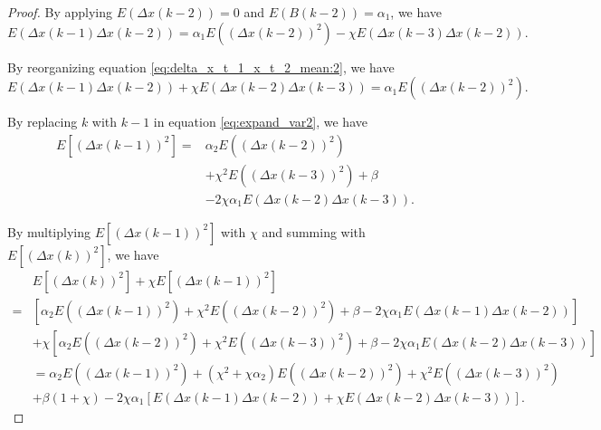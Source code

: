 \begin{proof}
By applying $ E( \Delta x(k-2) ) = 0 $ and $ E( B(k-2) ) = \alpha_{1} $, we have
\begin{equation}
\label{eq:delta_x_t_1_x_t_2_mean:2}
E( \Delta x(k-1) \Delta x(k-2) ) = \alpha_{1} E( ( \Delta x(k-2) )^{2} ) - \chi E( \Delta x(k-3) \Delta x(k-2) ).
\end{equation}

By reorganizing equation \eqref{eq:delta_x_t_1_x_t_2_mean:2}, we have
\begin{equation}
\label{eq:delta_x_t_1_x_t_2_mean:3}
E( \Delta x(k-1) \Delta x(k-2) ) + \chi E( \Delta x(k-2) \Delta x(k-3) ) = \alpha_{1} E( ( \Delta x(k-2) )^{2} ) .
\end{equation}

By replacing $ k $ with $ k - 1 $ in equation \eqref{eq:expand_var2}, we have
\begin{equation}
\label{eq:expand_var3}
\begin{aligned}
E[ (\Delta x(k-1))^{2} ] = & \alpha_{2} E( ( \Delta x(k-2) )^{2} ) \\
& + \chi^{2} E( ( \Delta x(k-3) )^{2} ) + \beta \\
& - 2 \chi \alpha_{1} E( \Delta x(k-2) \Delta x(k-3) ).
\end{aligned}
\end{equation}

By multiplying $ E[ (\Delta x(k-1))^{2} ] $ with $ \chi $ and summing with $ E[ (\Delta x(k))^{2} ] $, we have
\begin{equation}
\label{eq:generate_minus}
\begin{aligned}
& E[ (\Delta x(k))^{2} ] + \chi E[ (\Delta x(k-1))^{2} ] \\
= & [ \alpha_{2} E( ( \Delta x(k-1) )^{2} ) + \chi^{2} E( ( \Delta x(k-2) )^{2} ) + \beta - 2 \chi \alpha_{1} E( \Delta x(k-1) \Delta x(k-2) ) ] \\
& + \chi [  \alpha_{2} E( ( \Delta x(k-2) )^{2} ) + \chi^{2} E( ( \Delta x(k-3) )^{2} ) + \beta - 2 \chi \alpha_{1} E( \Delta x(k-2) \Delta x(k-3) ) ] \\
& = \alpha_{2} E( ( \Delta x(k-1) )^{2} ) + ( \chi^{2} + \chi \alpha_{2} ) E( ( \Delta x(k-2) )^{2} ) + \chi^{2} E( ( \Delta x(k-3) )^{2} ) \\
& + \beta ( 1 + \chi ) - 2 \chi \alpha_{1} [ E( \Delta x(k-1) \Delta x(k-2) ) + \chi E( \Delta x(k-2) \Delta x(k-3) ) ].
\end{aligned}
\end{equation}


\end{proof}
